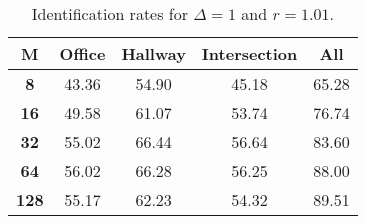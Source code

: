 \begin{table}[h]
    \footnotesize
    \centering
    \begin{tabular}{|c|c|c|c|l|}    
    \hline
    {\bf M} & {\bf Office} & {\bf Hallway} & {\bf Intersection} &     \multicolumn{1}{c|}{{\bf All}} \\ \hline
    {\bf 8} & 43.36 & 54.90 & 45.18 & 65.28 \\ \hline
    {\bf 16} & 49.58 & 61.07 & 53.74 & 76.74 \\ \hline
    {\bf 32} & 55.02 & 66.44 & 56.64 & 83.60 \\ \hline
    {\bf 64} & 56.02 & 66.28 & 56.25 & 88.00 \\ \hline
    {\bf 128} & 55.17 & 62.23 & 54.32 & 89.51 \\ \hline
    \end{tabular}
    \caption{Identification rates for $\Delta = 1$ and $r = 1.01$.}    
    \label{tab:identify_speakers_1.01_mit_19_1}
\end{table}
